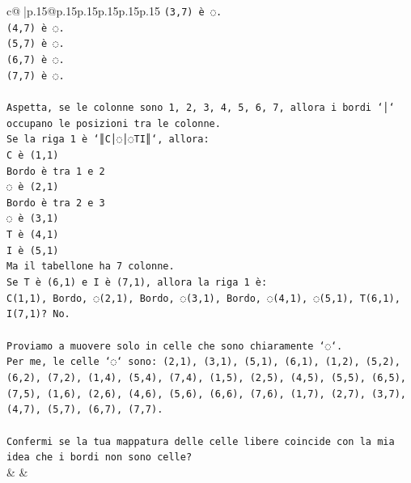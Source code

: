 \documentclass{article}
\begin{document}
{\begin{supertabular}{c@{$\;$}|p{.15\linewidth}@{}p{.15\linewidth}p{.15\linewidth}p{.15\linewidth}p{.15\linewidth}p{.15\linewidth}}
{{{\texttt{(3,7) è ◌.} \\
\texttt{(4,7) è ◌.} \\
\texttt{(5,7) è ◌.} \\
\texttt{(6,7) è ◌.} \\
\texttt{(7,7) è ◌.} \\
\\ 
\texttt{Aspetta, se le colonne sono 1, 2, 3, 4, 5, 6, 7, allora i bordi `│` occupano le posizioni tra le colonne.} \\
\texttt{Se la riga 1 è `║C│◌│◌TI║`, allora:} \\
\texttt{C è (1,1)} \\
\texttt{Bordo è tra 1 e 2} \\
\texttt{◌ è (2,1)} \\
\texttt{Bordo è tra 2 e 3} \\
\texttt{◌ è (3,1)} \\
\texttt{T è (4,1)} \\
\texttt{I è (5,1)} \\
\texttt{Ma il tabellone ha 7 colonne.} \\
\texttt{Se T è (6,1) e I è (7,1), allora la riga 1 è:} \\
\texttt{C(1,1), Bordo, ◌(2,1), Bordo, ◌(3,1), Bordo, ◌(4,1), ◌(5,1), T(6,1), I(7,1)? No.} \\
\\ 
\texttt{Proviamo a muovere solo in celle che sono chiaramente `◌`.} \\
\texttt{Per me, le celle `◌` sono: (2,1), (3,1), (5,1), (6,1), (1,2), (5,2), (6,2), (7,2), (1,4), (5,4), (7,4), (1,5), (2,5), (4,5), (5,5), (6,5), (7,5), (1,6), (2,6), (4,6), (5,6), (6,6), (7,6), (1,7), (2,7), (3,7), (4,7), (5,7), (6,7), (7,7).} \\
\\ 
\texttt{Confermi se la tua mappatura delle celle libere coincide con la mia idea che i bordi non sono celle?} \\
            }
        }
    }
    & & \\ \\


\end{supertabular}}
\end{document}

